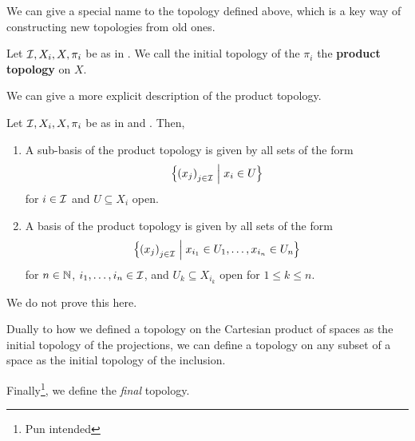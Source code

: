 We can give a special name to the topology defined above, which is a key way of constructing new topologies from old ones.

\begin{boxdefinition}\label{Ch1:Def:Prod_Top}
    Let $\mathcal{I}, X_i, X, \pi_i$ be as in . We call the initial topology of the $\pi_i$ the \textbf{product topology} on $X$.
\end{boxdefinition}

We can give a more explicit description of the product topology.

\begin{boxproposition}
    Let $\mathcal{I}, X_i, X, \pi_i$ be as in  and . Then,
    \begin{enumerate}
        \item A sub-basis of the product topology is given by all sets of the form
        \begin{align*}
            \left\{ \left( x_j \right)_{j \in \mathcal{I}} \; \middle\vert \; x_i \in U \right\}
        \end{align*}
        for $i \in \mathcal{I}$ and $U \subseteq X_i$ open.

        \item A basis of the product topology is given by all sets of the form
        \begin{align*}
            \left\{ \left( x_j \right)_{j \in \mathcal{I}} \; \middle\vert \; x_{i_1} \in U_1, \ldots, x_{i_n} \in U_n \right\}
        \end{align*}
        for $n \in \mathbb{N}$, $i_1, \ldots, i_n \in \mathcal{I}$, and $U_k \subseteq X_{i_k}$ open for $1 \leq k \leq n$.
    \end{enumerate}
\end{boxproposition}

We do not prove this here.

Dually to how we defined a topology on the Cartesian product of spaces as the initial topology of the projections, we can define a topology on any subset of a space as the initial topology of the inclusion.

Finally\footnote{Pun intended}, we define the \textit{final} topology.

